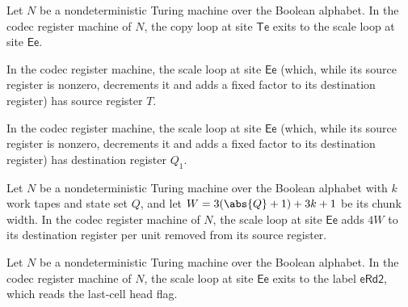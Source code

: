 \begin{lemma}
\label{Complexity.Codec.cpNext_Te}
\leanok
{}
Let $N$ be a nondeterministic Turing machine over the Boolean alphabet. In the codec
register machine of $N$, the copy loop at site $\mathsf{Te}$ exits to the scale loop at
site $\mathsf{Ee}$.
\end{lemma}

\begin{lemma}
\label{Complexity.Codec.scSrc_Ee}
\leanok
{}
In the codec register machine, the scale loop at site $\mathsf{Ee}$ (which, while its
source register is nonzero, decrements it and adds a fixed factor to its destination
register) has source register $T$.
\end{lemma}

\begin{lemma}
\label{Complexity.Codec.scDst_Ee}
\leanok
{}
In the codec register machine, the scale loop at site $\mathsf{Ee}$ (which, while its
source register is nonzero, decrements it and adds a fixed factor to its destination
register) has destination register $Q_1$.
\end{lemma}

\begin{lemma}
\label{Complexity.Codec.scFactor_Ee}
\leanok
{}
Let $N$ be a nondeterministic Turing machine over the Boolean alphabet with $k$ work tapes
and state set $Q$, and let $W = 3(\abs{Q}+1) + 3k + 1$ be its chunk width. In the codec
register machine of $N$, the scale loop at site $\mathsf{Ee}$ adds $4W$ to its
destination register per unit removed from its source register.
\end{lemma}

\begin{lemma}
\label{Complexity.Codec.scNext_Ee}
\leanok
{}
Let $N$ be a nondeterministic Turing machine over the Boolean alphabet. In the codec
register machine of $N$, the scale loop at site $\mathsf{Ee}$ exits to the label
$\mathsf{eRd2}$, which reads the last-cell head flag.
\end{lemma}

